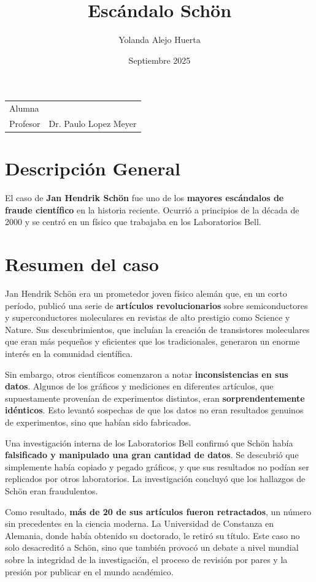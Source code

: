 \documentclass{article}
\title{Escándalo Schön}
\author{Yolanda Alejo Huerta}
\date{Septiembre 2025}
\begin{document}
\maketitle

\noindent\begin{tabular}{@{}ll}
	Alumna & \theauthor\\
	Profesor & Dr. Paulo Lopez Meyer
\end{tabular}

\section*{Descripción General}
El caso de \textbf{Jan Hendrik Schön} fue uno de los \textbf{mayores
escándalos de fraude científico} en la historia reciente. Ocurrió a principios de la década de 2000 y se centró en un físico que trabajaba en los Laboratorios Bell.

\section*{Resumen del caso}

Jan Hendrik Schön era un prometedor joven físico alemán que, en un corto
período, publicó una serie de \textbf{artículos revolucionarios} sobre
semiconductores y superconductores moleculares en revistas de alto prestigio
como Science y Nature. Sus descubrimientos, que incluían la creación de
transistores moleculares que eran más pequeños y eficientes que los
tradicionales, generaron un enorme interés en la comunidad científica.


Sin embargo, otros científicos comenzaron a notar \textbf{inconsistencias
en sus datos}. Algunos de los gráficos y mediciones en diferentes artículos, que
supuestamente provenían de experimentos distintos, eran
\textbf{sorprendentemente idénticos}. Esto levantó sospechas de que los
datos no eran resultados genuinos de experimentos, sino que habían
sido fabricados.


Una investigación interna de los Laboratorios Bell confirmó que Schön había
\textbf{falsificado y manipulado una gran cantidad de datos}. Se descubrió que
simplemente había copiado y pegado gráficos, y que sus resultados no podían
ser replicados por otros laboratorios. La investigación concluyó que los
hallazgos de Schön eran fraudulentos.

Como resultado, \textbf{más de 20 de sus artículos fueron retractados}, un
número sin precedentes en la ciencia moderna. La Universidad de Constanza en
Alemania, donde había obtenido su doctorado, le retiró su título. Este caso
no solo desacreditó a Schön, sino que también provocó un debate a nivel
mundial sobre la integridad de la investigación, el proceso de revisión por
pares y la presión por publicar en el mundo académico.
\end{document}
